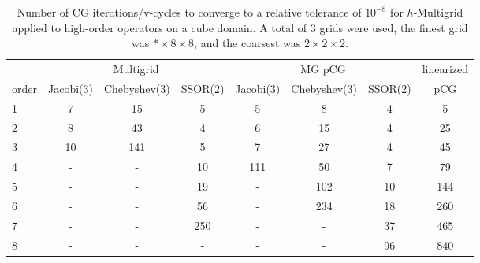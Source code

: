 


\begin{table}
  \caption{\label{tab:homg} Number of CG iterations/v-cycles to converge to a relative tolerance of $10^{-8}$ for $h$-Multigrid applied to high-order operators on a cube domain. A total of 3 grids were used, the finest grid was $*\times 8\times 8$, and the coarsest was $2\times 2\times 2$.}
		\centering
    \begin{tabular}{|l|c|c|c|c|c|c|c|} 
	    \hline
				    & \multicolumn{3}{c|}{Multigrid} & \multicolumn{3}{c|}{MG pCG} & linearized \\  \cline{2-7}
			order & \scriptsize Jacobi(3)  &\scriptsize  Chebyshev(3)  &\scriptsize SSOR(2) &\scriptsize Jacobi(3)  &\scriptsize  Chebyshev(3)  &\scriptsize SSOR(2) & pCG \\
			\hline
        1 & 7 & 15 & 5 & 5 & 8 & 4    & 5    \\
	    	2 & 8 & 43 & 4 & 6 & 15 & 4   & 25   \\
        3 & 10 & 141 & 5 & 7 & 27 & 4 & 45   \\
        4 & - & - & 10 & 111 & 50 & 7 & 79   \\
				5 & - & - & 19 & - & 102 & 10 & 144  \\
        6 & - & - & 56 & - & 234 & 18 & 260  \\
			  7 & - & - & 250 & - & - & 37  & 465  \\	
				8 & - & - & -   & - & - & 96  & 840  \\
			\hline
	  \end{tabular}
\end{table}


